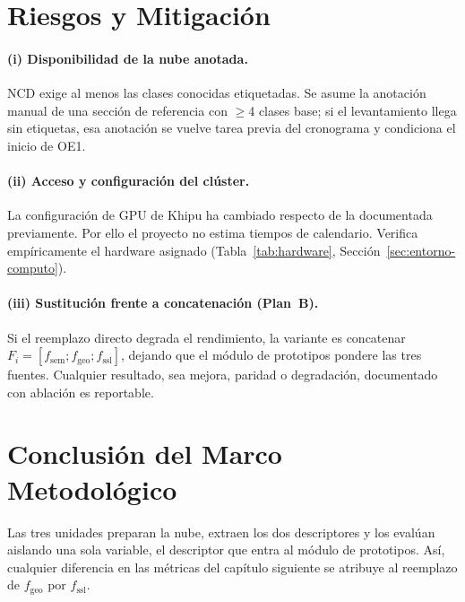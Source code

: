 \FloatBarrier
\section{Riesgos y Mitigación}
\label{sec:riesgos}

\paragraph*{(i) Disponibilidad de la nube anotada.} NCD exige al menos las clases
conocidas etiquetadas. Se asume la anotación manual de una sección de referencia
con $\geq$4 clases base; si el levantamiento llega sin etiquetas, esa anotación
se vuelve tarea previa del cronograma y condiciona el inicio de OE1.

\paragraph*{(ii) Acceso y configuración del clúster.} La configuración de GPU de
Khipu ha cambiado respecto de la documentada previamente. Por ello el proyecto no
estima tiempos de calendario. Verifica empíricamente el hardware asignado
(Tabla~\ref{tab:hardware}, Sección~\ref{sec:entorno-computo}).

\paragraph*{(iii) Sustitución frente a concatenación (Plan~B).} Si el reemplazo
directo degrada el rendimiento, la variante es concatenar
$F_i=[f_{\mathrm{sem}};f_{\mathrm{geo}};f_{\mathrm{ssl}}]$, dejando que el módulo
de prototipos pondere las tres fuentes. Cualquier resultado, sea mejora, paridad o
degradación, documentado con ablación es reportable.

\FloatBarrier
\section{Conclusión del Marco Metodológico}
\label{sec:conclusion-metodo}

Las tres unidades preparan la nube, extraen los dos descriptores y los evalúan
aislando una sola variable, el descriptor que entra al módulo de prototipos. Así,
cualquier diferencia en las métricas del capítulo siguiente se atribuye al
reemplazo de $f_{\mathrm{geo}}$ por $f_{\mathrm{ssl}}$.
